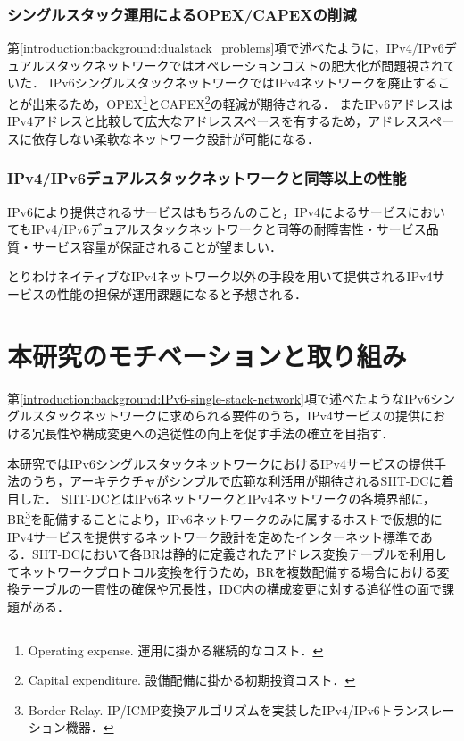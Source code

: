 \subsubsection{シングルスタック運用によるOPEX/CAPEXの削減}
第\ref{introduction:background:dualstack_problems}項で述べたように，IPv4/IPv6デュアルスタックネットワークではオペレーションコストの肥大化が問題視されていた．
IPv6シングルスタックネットワークではIPv4ネットワークを廃止することが出来るため，OPEX\footnote{Operating expense. 運用に掛かる継続的なコスト．}とCAPEX\footnote{Capital expenditure. 設備配備に掛かる初期投資コスト．}の軽減が期待される．
またIPv6アドレスはIPv4アドレスと比較して広大なアドレススペースを有するため，アドレススペースに依存しない柔軟なネットワーク設計が可能になる．

\subsubsection{IPv4/IPv6デュアルスタックネットワークと同等以上の性能}
IPv6により提供されるサービスはもちろんのこと，IPv4によるサービスにおいてもIPv4/IPv6デュアルスタックネットワークと同等の耐障害性・サービス品質・サービス容量が保証されることが望ましい．

とりわけネイティブなIPv4ネットワーク以外の手段を用いて提供されるIPv4サービスの性能の担保が運用課題になると予想される．




\section{本研究のモチベーションと取り組み}
第\ref{introduction:background:IPv6-single-stack-network}項で述べたようなIPv6シングルスタックネットワークに求められる要件のうち，IPv4サービスの提供における冗長性や構成変更への追従性の向上を促す手法の確立を目指す．

本研究ではIPv6シングルスタックネットワークにおけるIPv4サービスの提供手法のうち，アーキテクチャがシンプルで広範な利活用が期待されるSIIT-DC\cite{RFC7755}に着目した．
SIIT-DCとはIPv6ネットワークとIPv4ネットワークの各境界部に，BR\footnote{Border Relay. IP/ICMP変換アルゴリズム\cite{RFC7915}を実装したIPv4/IPv6トランスレーション機器．}を配備することにより，IPv6ネットワークのみに属するホストで仮想的にIPv4サービスを提供するネットワーク設計を定めたインターネット標準である．SIIT-DCにおいて各BRは静的に定義されたアドレス変換テーブルを利用してネットワークプロトコル変換を行うため，BRを複数配備する場合における変換テーブルの一貫性の確保や冗長性，IDC内の構成変更に対する追従性の面で課題がある．

